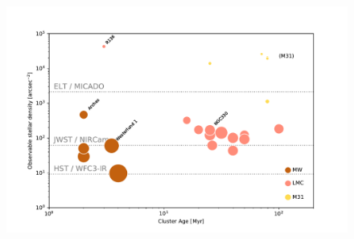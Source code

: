 \begin{figure}

    \centering
    \includegraphics[width=\textwidth]{images/star_density_vs_age}


\end{figure}

